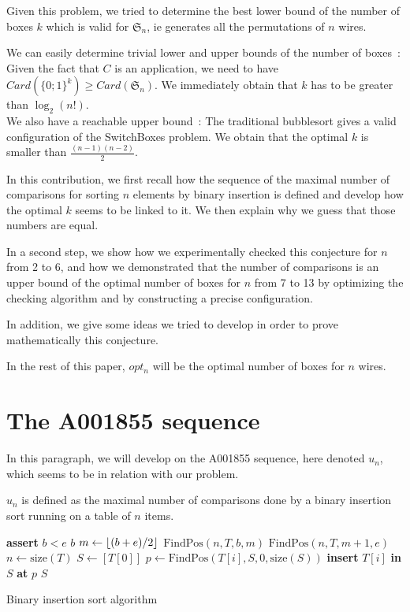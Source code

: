 \documentclass[11pt, a4paper]{article}
\DeclarePairedDelimiter{\floor}{\lfloor}{\rfloor}
\begin{document}
Given this problem, we tried to determine the best lower bound of the number of
boxes $k$ which is valid for $\mathfrak{S}_n$, ie generates all the permutations of $n$
wires.

We can easily determine trivial lower and upper bounds of the number of
boxes~:\\ Given the fact that $C$ is an application, we need to have
$Card(\{0;1\}^{k}) \geq Card(\mathfrak{S}_n)$. We immediately obtain that $k$
has to be greater than $\log_2(n!)$.\\ We also have a reachable upper bound~: The
traditional bubblesort gives a valid configuration of the SwitchBoxes problem. We
obtain that the optimal $k$ is smaller than $\frac{(n-1)(n-2)}{2}$.

In this contribution, we first recall how the sequence of the maximal number of
comparisons for sorting $n$ elements by binary insertion is defined and develop
how the optimal $k$ seems to be linked to it.  We then explain why we guess that
those numbers are equal.

In a second step, we show how we experimentally checked this conjecture for $n$ from 2 to 6, and
how we demonstrated that the number of comparisons is an upper bound of the
optimal number of boxes for $n$ from 7 to 13 by optimizing the checking
algorithm and by constructing a precise configuration.

In addition, we give some ideas we tried to develop in order to prove
mathematically this conjecture.

In the rest of this paper, $opt_n$ will be the optimal number of boxes for $n$
wires.


\section{The A001855 sequence}

In this paragraph, we will develop on the A001855 sequence, here denoted $u_n$,
which seems to be in relation with our problem.

$u_n$ is defined as the maximal number of comparisons done by a binary
insertion sort running on a table of $n$ items.

\begin{algorithm}
\begin{algorithmic}
	\State \textbf{assert} $b < e$
		\State \Return $b$
	\Else
		\State $m \gets \floor{(b+e)/2}$
			\State \Return $\mathrm{FindPos}(n, T, b, m)$
		\Else
			\State \Return $\mathrm{FindPos}(n, T, m+1, e)$
		\EndIf
	\EndIf
\EndFunction
	\\
	\State $n \gets \mathrm{size}(T)$
	\State $S \gets [ T[0] ]$
		\State $p \gets \mathrm{FindPos}(T[i], S, 0, \mathrm{size}(S))$
		\State \textbf{insert} $T[i]$ \textbf{in} $S$ \textbf{at} $p$
	\EndFor
	\State \Return $S$
\EndFunction
\end{algorithmic}
\caption{Binary insertion sort algorithm}
\end{algorithm}
\end{document}
